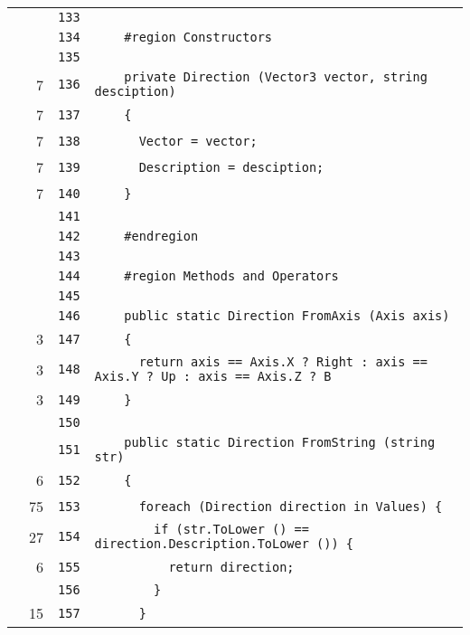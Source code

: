 \documentclass[a4paper,10pt]{article}
\begin{document}
\begin{longtable}[l]{lrrl}
\cellcolor{gray} &  & \verb~133~ & \verb~~\\
\cellcolor{gray} &  & \verb~134~ & \verb~    #region Constructors~\\
\cellcolor{gray} &  & \verb~135~ & \verb~~\\
\cellcolor{green} & 7 & \verb~136~ & \verb~    private Direction (Vector3 vector, string desciption)~\\
\cellcolor{green} & 7 & \verb~137~ & \verb~    {~\\
\cellcolor{green} & 7 & \verb~138~ & \verb~      Vector = vector;~\\
\cellcolor{green} & 7 & \verb~139~ & \verb~      Description = desciption;~\\
\cellcolor{green} & 7 & \verb~140~ & \verb~    }~\\
\cellcolor{gray} &  & \verb~141~ & \verb~~\\
\cellcolor{gray} &  & \verb~142~ & \verb~    #endregion~\\
\cellcolor{gray} &  & \verb~143~ & \verb~~\\
\cellcolor{gray} &  & \verb~144~ & \verb~    #region Methods and Operators~\\
\cellcolor{gray} &  & \verb~145~ & \verb~~\\
\cellcolor{gray} &  & \verb~146~ & \verb~    public static Direction FromAxis (Axis axis)~\\
\cellcolor{green} & 3 & \verb~147~ & \verb~    {~\\
\cellcolor{green} & 3 & \verb~148~ & \verb~      return axis == Axis.X ? Right : axis == Axis.Y ? Up : axis == Axis.Z ? B~\\
\cellcolor{green} & 3 & \verb~149~ & \verb~    }~\\
\cellcolor{gray} &  & \verb~150~ & \verb~~\\
\cellcolor{gray} &  & \verb~151~ & \verb~    public static Direction FromString (string str)~\\
\cellcolor{green} & 6 & \verb~152~ & \verb~    {~\\
\cellcolor{green} & 75 & \verb~153~ & \verb~      foreach (Direction direction in Values) {~\\
\cellcolor{green} & 27 & \verb~154~ & \verb~        if (str.ToLower () == direction.Description.ToLower ()) {~\\
\cellcolor{green} & 6 & \verb~155~ & \verb~          return direction;~\\
\cellcolor{gray} &  & \verb~156~ & \verb~        }~\\
\cellcolor{green} & 15 & \verb~157~ & \verb~      }~\\

\end{longtable}
\end{document}
